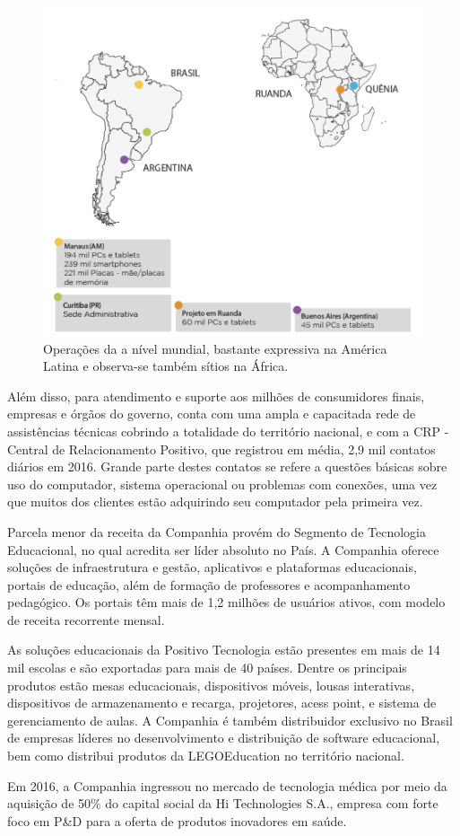 \begin{figure}[h]
\begin{centering}
\includegraphics[width=1.0\textwidth]{Img/PositivoMundo}
\caption{Operações da \nomePositivo{} a nível mundial, bastante expressiva na América Latina e observa-se também sítios na África.}
\par\end{centering}
\end{figure}

Além disso, para atendimento e suporte aos milhões de consumidores finais, empresas e órgãos do governo, conta com uma ampla e capacitada rede de assistências técnicas cobrindo a totalidade do território nacional, e com a CRP - Central de Relacionamento Positivo, que registrou em média, 2,9 mil contatos diários em 2016. Grande parte destes contatos se refere a questões básicas sobre uso do computador, sistema operacional ou problemas com conexões, uma vez que muitos dos clientes estão adquirindo seu computador pela primeira vez.

Parcela menor da receita da Companhia provém do Segmento de Tecnologia Educacional, no qual acredita ser líder absoluto no País. A Companhia oferece soluções de infraestrutura e gestão, aplicativos e plataformas educacionais, portais de educação, além de formação de professores e acompanhamento pedagógico. Os portais têm mais de 1,2 milhões de usuários ativos, com modelo de receita recorrente mensal. 

As soluções educacionais da Positivo Tecnologia estão presentes em mais de 14 mil escolas e são exportadas para mais de 40 países. Dentre os principais produtos estão mesas educacionais, dispositivos móveis, lousas interativas, dispositivos de armazenamento e recarga, projetores, acess point, e sistema de gerenciamento de aulas. A Companhia é também distribuidor exclusivo no Brasil de empresas líderes no desenvolvimento e distribuição de software educacional, bem como distribui produtos da LEGO\texttrademark Education no território nacional.

Em 2016, a Companhia ingressou no mercado de tecnologia médica por meio da aquisição de 50\% do capital social da Hi Technologies S.A., empresa com forte foco em P\&D para a oferta de produtos inovadores em saúde.
